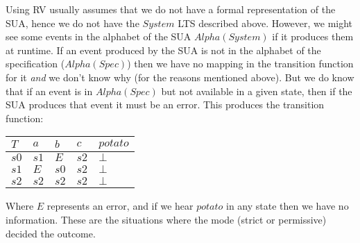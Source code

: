 \documentclass[12pt,a4paper]{article}
\begin{document}
Using RV usually assumes that we do not have a formal representation of the SUA, hence we do not have the $System$ LTS described above. However, we might see some events in the alphabet of the SUA $Alpha(System)$ if it produces them at runtime. If an event produced by the SUA is not in the alphabet of the specification ($Alpha(Spec)$) then we have no mapping in the transition function for it \textit{and} we don't know why (for the reasons mentioned above). 
But we do know that if an event is in $Alpha(Spec)$ but not available in a given state, then if the SUA produces that event it must be an error. 
This produces the transition function:
\begin{center}
\begin{tabular}{l|l|l|l|l}
$T$  &  $a$ & $b$ & $c$ & $potato$\\
\hline
$s0$ & $s1$ & $E$ & $s2$ & $\bot$\\
$s1$ & $E$ & $s0$ & $s2$ & $\bot$\\ 
$s2$ & $s2$ & $s2$ &$s2$ & $\bot$\\
\end{tabular}
\end{center}
\noindent Where $E$ represents an error, and if we hear $potato$ in any state then we have no information. These are the situations where the mode (strict or permissive) decided the outcome.
\end{document}
